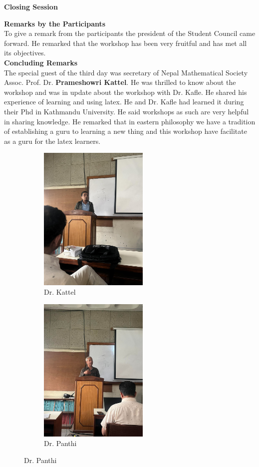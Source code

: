 \documentclass[a4paper,12pt]{report}
\begin{document}
\vspace*{3mm}
\begin{center}
  {\bfseries \Large Closing Session}
\end{center}
\vspace{5mm}

{\bfseries \large Remarks by the Participants}\\[3mm]
To give a remark from the participants the president of the Student Council came forward. He remarked that the workshop has been very fruitful and has met all its objectives.\\[7mm]

{\bfseries \large Concluding Remarks}\\[3mm]
The special guest of the third day was secretary of Nepal Mathematical Society Assoc. Prof. Dr. \textbf{Prameshowri Kattel}. He was thrilled to know about the workshop and was in update about the workshop with Dr. Kafle. He shared his experience of learning and using latex. He and Dr. Kafle had learned it during their Phd in Kathmandu University. He said workshops as such are very helpful in sharing knowledge. He remarked that in eastern philosophy we have a tradition of establishing a guru to learning a new thing and this workshop have facilitate as a guru for the latex learners.
\vspace{5mm}

\begin{figure}[h!]
\centering
\begin{subfigure}{0.45\textwidth}
  \includegraphics[height=7cm, width=\textwidth]{pramesh.jpg}
  \caption{Dr. Kattel}
\end{subfigure}
\hfill
\begin{subfigure}{0.45\textwidth}
  \includegraphics[height=7cm, width=\textwidth]{dinesh.jpg}
  \caption{Dr. Panthi}
\end{subfigure}
\end{figure}
\end{document}
